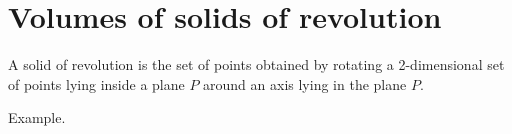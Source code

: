 \documentclass[12pt]{book}
\begin{document}
\section{Volumes of solids of revolution}
A solid of revolution is the set of points obtained by rotating a 2-dimensional set of points lying inside a plane $P$ around an axis lying in the plane $P$.

Example. \label{itemExampleFigureRotationalSolid}

\end{document}
